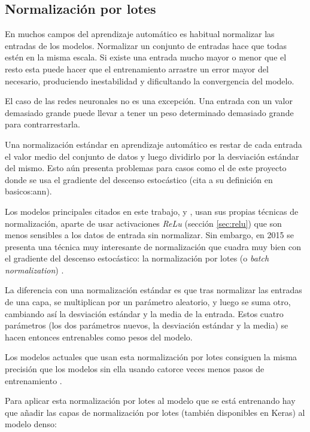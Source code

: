 \subsection{Normalización por lotes}

En muchos campos del aprendizaje automático es habitual normalizar las entradas de los modelos. Normalizar un conjunto de entradas hace que todas estén en la misma escala. Si existe una entrada mucho mayor o menor que el resto esta puede hacer que el entrenamiento arrastre un error mayor del necesario, produciendo inestabilidad y dificultando la convergencia del modelo.

El caso de las redes neuronales no es una excepción. Una entrada con un valor demasiado grande puede llevar a tener un peso determinado demasiado grande para contrarrestarla.

Una normalización estándar en aprendizaje automático es restar de cada entrada el valor medio del conjunto de datos y luego dividirlo por la desviación estándar del mismo. Esto aún presenta problemas para casos como el de este proyecto donde se usa el gradiente del descenso estocástico (cita a su definición en basicos:ann).

Los modelos principales citados en este trabajo, \parencite{krizhevsky2012imagenet} y \parencite{simonyan}, usan sus propias técnicas de normalización, aparte de usar activaciones \textit{ReLu} (sección \ref{sec:relu}) que son menos sensibles a los datos de entrada sin normalizar. Sin embargo, en 2015 se presenta una técnica muy interesante de normalización que cuadra muy bien con el gradiente del descenso estocástico: la normalización por lotes (o \textit{batch normalization}) \parencite{batch_normalization}.

La diferencia con una normalización estándar es que tras normalizar las entradas de una capa, se multiplican por un parámetro aleatorio, y luego se suma otro, cambiando así la desviación estándar y la media de la entrada. Estos cuatro parámetros (los dos parámetros nuevos, la desviación estándar y la media) se hacen entonces entrenables como pesos del modelo.

Los modelos actuales que usan esta normalización por lotes consiguen la misma precisión que los modelos sin ella usando catorce veces menos pasos de entrenamiento \parencite{batch_normalization}.

Para aplicar esta normalización por lotes al modelo que se está entrenando hay que añadir las capas de normalización por lotes (también disponibles en Keras) al modelo denso:

